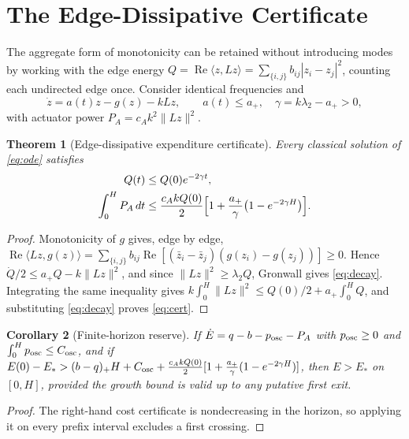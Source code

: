 \documentclass[11pt,notitlepage]{report}
\newtheorem{theorem}{Theorem}[chapter]
\newtheorem{corollary}[theorem]{Corollary}
\theoremstyle{definition}
\theoremstyle{remark}
\newcommand{\re}{\operatorname{Re}}
\begin{document}
\section{The Edge-Dissipative Certificate}
The aggregate form of monotonicity can be retained without introducing modes by working with the edge energy $Q=\re\langle z,Lz\rangle=\sum_{\{i,j\}}b_{ij}|z_i-z_j|^2$, counting each undirected edge once. Consider identical frequencies and
\begin{equation}\label{eq:ode}
\dot z=a(t)z-g(z)-kLz,\qquad a(t)\le a_+,\quad \gamma=k\lambda_2-a_+>0,
\end{equation}
with actuator power $P_A=c_Ak^2\|Lz\|^2$.
\begin{theorem}[Edge-dissipative expenditure certificate]\label{th:edge}
Every classical solution of \eqref{eq:ode} satisfies
\begin{align}
Q(t)&\le Q(0)e^{-2\gamma t},\label{eq:decay}\\
\int_0^HP_A\,dt&\le\frac{c_AkQ(0)}2\Bigl[1+\frac{a_+}\gamma\bigl(1-e^{-2\gamma H}\bigr)\Bigr].\label{eq:cert}
\end{align}
\end{theorem}
\begin{proof}
Monotonicity of $g$ gives, edge by edge, $\re\langle Lz,g(z)\rangle=\sum_{\{i,j\}}b_{ij}\re[(\bar z_i-\bar z_j)(g(z_i)-g(z_j))]\ge0$. Hence $\dot Q/2\le a_+Q-k\|Lz\|^2$, and since $\|Lz\|^2\ge\lambda_2Q$, Gronwall gives \eqref{eq:decay}. Integrating the same inequality gives $k\int_0^H\|Lz\|^2\le Q(0)/2+a_+\int_0^HQ$, and substituting \eqref{eq:decay} proves \eqref{eq:cert}.
\end{proof}
\begin{corollary}[Finite-horizon reserve]\label{cor:edgereserve}
If $\dot E=q-b-p_{\rm osc}-P_A$ with $p_{\rm osc}\ge0$ and $\int_0^Hp_{\rm osc}\le C_{\rm osc}$, and if $E(0)-E_*>(b-q)_+H+C_{\rm osc}+\tfrac{c_AkQ(0)}2[1+\tfrac{a_+}\gamma(1-e^{-2\gamma H})]$, then $E>E_*$ on $[0,H]$, provided the growth bound is valid up to any putative first exit.
\end{corollary}
\begin{proof}
The right-hand cost certificate is nondecreasing in the horizon, so applying it on every prefix interval excludes a first crossing.
\end{proof}
\end{document}
